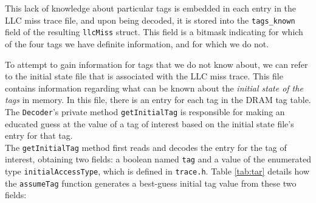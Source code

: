 This lack of knowledge about particular tags is embedded in each entry in the LLC miss trace file, and upon being decoded, it is stored into the \texttt{tags\_known} field of the resulting \texttt{llcMiss} struct. This field is a bitmask indicating for which of the four tags we have definite information, and for which we do not.

To attempt to gain information for tags that we do not know about, we can refer to the initial state file that is associated with the LLC miss trace. This file contains information regarding what can be known about the \textit{initial state of the tags} in memory. In this file, there is an entry for each tag in the DRAM tag table. The \texttt{Decoder}'s private method \texttt{getInitialTag} is responsible for making an educated guess at the value of a tag of interest based on the initial state file's entry for that tag.\\
The \texttt{getInitialTag} method first reads and decodes the entry for the tag of interest, obtaining two fields: a boolean named \texttt{tag} and a value of the enumerated type \texttt{initialAccessType}, which is defined in \texttt{trace.h}. Table \ref{tab:tar} details how the \texttt{assumeTag} function generates a best-guess initial tag value from these two fields:

